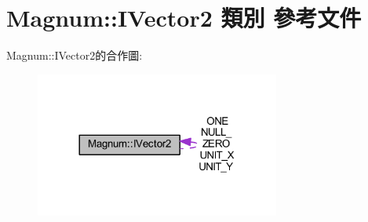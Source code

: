 \hypertarget{class_magnum_1_1_i_vector2}{}\section{Magnum\+:\+:I\+Vector2 類別 參考文件}
\label{class_magnum_1_1_i_vector2}


Magnum\+:\+:I\+Vector2的合作圖\+:\nopagebreak
\begin{figure}[H]
\begin{center}
\leavevmode
\includegraphics[width=228pt]{class_magnum_1_1_i_vector2__coll__graph}
\end{center}
\end{figure}
